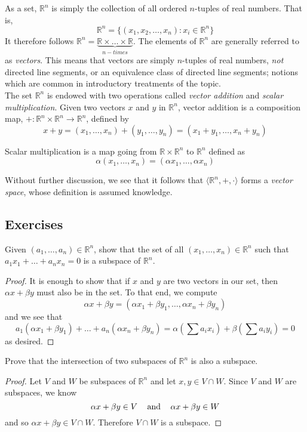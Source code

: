 As a set, \( \mathbb{R}^n \) is simply the collection of all ordered \(n\)-tuples of real numbers. That is,
\[
\mathbb{R}^n=\{ (x_1,x_2,\ldots,x_n): x_i \in \mathbb{R}^n \}
\]
It therefore follows \( \mathbb{R}^n = \underbrace{\mathbb{R}\times\ldots\times\mathbb{R}}_{n-times} \). The elements of \( \mathbb{R}^n \) are generally referred to as \emph{vectors}. This means that vectors are simply \( n\)-tuples of real numbers, \emph{not} directed line segments, or an equivalence class of directed line segments; notions which are common in introductory treatments of the topic. 
\\

The set \( \mathbb{R}^n \) is endowed with two operations called \emph{vector addition} and \emph{scalar multiplication}. Given two vectors \( x \) and \( y \) in \( \mathbb{R}^n \), vector addition is a composition map, \( +: \mathbb{R}^n \times \mathbb{R}^n \rightarrow \mathbb{R}^n \), defined by
\[
x+y = (x_1,\ldots,x_n)+(y_1,\ldots,y_n) = (x_1+y_1,\ldots,x_n+y_n)
\]

Scalar multiplication is a map going from \( \mathbb{R} \times \mathbb{R}^n \) to \( \mathbb{R}^n \) defined as
\[
\alpha (x_1,\ldots,x_n) = (\alpha x_1, \ldots, \alpha x_n)
\]

Without further discussion, we see that it follows that \( \langle \mathbb{R}^n,+,\cdot \rangle \) forms a \emph{vector space}, whose definition is assumed knowledge.

\subsection*{Exercises}
    \question Given \( (a_1,\ldots,a_n) \in \mathbb{R}^n \), show that the set of all \( (x_1,\ldots,x_n) \in \mathbb{R}^n \) such that \( a_1x_1+\ldots+a_nx_n=0 \) is a subspace of \(\mathbb{R}^n \).
    \begin{proof}
    It is enough to show that if \( x \) and \( y \) are two vectors in our set, then  \( \alpha x + \beta y \) must also be in the set. To that end, we compute
    \[
    \alpha x + \beta y = (\alpha x_1+\beta y_1, \ldots, \alpha x_n+\beta y_n)
    \]
    and we see that
    \[
    a_1(\alpha x_1 + \beta y_1)+\ldots+a_n(\alpha x_n + \beta y_n) = \alpha \left(\sum a_ix_i\right) + \beta \left(\sum a_iy_i\right) = 0
    \]
    as desired.
    \end{proof}
    
    \question Prove that the intersection of two subspaces of \( \mathbb{R}^n \) is also a subspace.
    \begin{proof}
    Let \( V \) and \( W \) be subspaces of \( \mathbb{R}^n \) and let \( x,y \in V \cap W \). Since \( V \) and \( W \) are subspaces, we know
    \[
    \alpha x + \beta y \in V \hspace{3mm} \text{ and } \hspace{3mm} \alpha x + \beta y \in W
    \]
    and so \( \alpha x + \beta y \in V \cap W \). Therefore \( V \cap W \) is a subspace.
    \end{proof}
    
